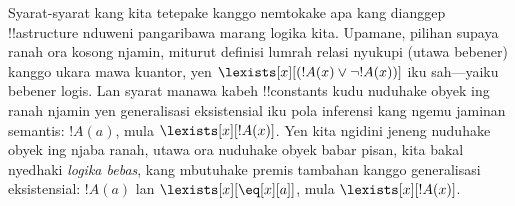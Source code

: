 \documentclass[../../../include/open-logic-section]{subfiles}
\begin{document}
\begin{digress}
Syarat-syarat kang kita tetepake kanggo nemtokake apa kang dianggep
!!a{structure} nduweni pangaribawa marang logika kita. Upamane,
pilihan supaya ranah ora kosong njamin, miturut definisi lumrah
relasi nyukupi (utawa bebener) kanggo ukara mawa kuantor, yen
$\lexists[x][(!A(x) \lor \lnot !A(x))]$ iku sah---yaiku bebener
logis. Lan syarat manawa kabeh !!{constant}s kudu nuduhake obyek
ing ranah njamin yen generalisasi eksistensial iku pola inferensi
kang ngemu jaminan semantis: $!A(a)$, mula
$\lexists[x][!A(x)]$. Yen kita ngidini jeneng nuduhake obyek
ing njaba ranah, utawa ora nuduhake obyek babar pisan, kita bakal
nyedhaki \emph{logika bebas}, kang mbutuhake premis tambahan kanggo
generalisasi eksistensial: $!A(a)$ lan
$\lexists[x][\eq[x][a]]$, mula $\lexists[x][!A(x)]$.
\end{digress}
\end{document}
